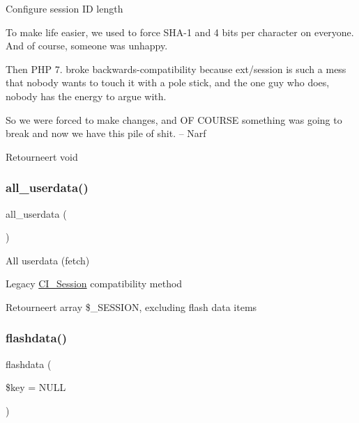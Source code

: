 Configure session ID length

To make life easier, we used to force S\+H\+A-\/1 and 4 bits per character on everyone. And of course, someone was unhappy.

Then P\+HP 7. broke backwards-\/compatibility because ext/session is such a mess that nobody wants to touch it with a pole stick, and the one guy who does, nobody has the energy to argue with.

So we were forced to make changes, and OF C\+O\+U\+R\+SE something was going to break and now we have this pile of shit. -- Narf

\begin{DoxyReturn}{Retourneert}
void 
\end{DoxyReturn}
\mbox{\label{class_c_i___session_a974fa60ddc074b14ffcc78ef9902bc5c}} 
\subsubsection{\texorpdfstring{all\_userdata()}{all\_userdata()}}
{\footnotesize\ttfamily all\+\_\+userdata (\begin{DoxyParamCaption}{ }\end{DoxyParamCaption})}

All userdata (fetch)

Legacy \mbox{\hyperlink{class_c_i___session}{C\+I\+\_\+\+Session}} compatibility method

\begin{DoxyReturn}{Retourneert}
array \$\+\_\+\+S\+E\+S\+S\+I\+ON, excluding flash data items 
\end{DoxyReturn}
\mbox{\label{class_c_i___session_acc27ddf9dd242d2c887eca2504136cff}} 
\subsubsection{\texorpdfstring{flashdata()}{flashdata()}}
{\footnotesize\ttfamily flashdata (\begin{DoxyParamCaption}\item[{}]{\$key = {\ttfamily NULL} }\end{DoxyParamCaption})}

